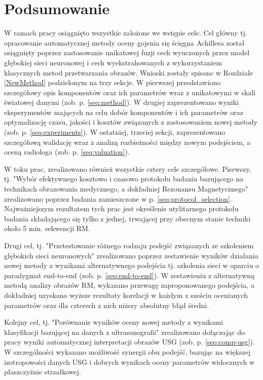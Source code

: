 \chapter{Podsumowanie}

W ramach pracy osiągnięto wszystkie założone we wstępie cele. Cel główny tj. opracowanie automatycznej metody oceny gojenia się ścięgna Achillesa został osiągnięty poprzez zastosowanie unikatowej fuzji cech wyuczonych przez model głębokiej sieci neuronowej i cech wyekstrahowanych z wykorzystaniem klasycznych metod przetwarzania obrazów. Wnioski zostały spisane w Rozdziale \ref{NewMethod} podzielonym na trzy sekcje. W pierwszej przedstawiono szczegółowy opis komponentów oraz ich parametrów wraz z unikatowymi w skali światowej danymi (zob. p. \ref{seq:method}). W drugiej zaprezentowano wyniki eksperymentów mających na celu dobór komponentów i ich parametrów oraz optymalizację czasu, jakości i kosztów związanych z zastosowaniem nowej metody (zob. p. \ref{seq:experiments}). W ostatniej, trzeciej sekcji, zaprezentowano szczegółową walidację wraz z analizą rozbieżności między nowym podejściem, a oceną radiologa (zob. p. \ref{seq:valuation}).

W toku prac, zrealizowano również wszystkie cztery cele szczegółowe. Pierwszy, tj. "Wybór efektywnego kosztowo i czasowo protokołu badania bazującego \linebreak na technikach obrazowania medycznego, a dokładniej Rezonansu Magnetycznego" zrealizowano poprzez badania zamieszczone w p. \ref{seq:protocol_selection}. Najważniejszym rezultatem tych prac jest określenie utylitarnego protokołu badania składającego się tylko \linebreak z jednej, trwającej przy obecnym stanie techniki około 5 min. sekwencji RM. 

Drugi cel, tj. "Przetestowanie różnego rodzaju podejść związanych ze szkoleniem głębokich sieci neuronowych" zrealizowano poprzez zestawienie wyników działania nowej metody z wynikami alternatywnego podejścia tj. szkolenia sieci w oparciu \linebreak o paradygmat end-to-end (zob. p. \ref{seq:end-to-end}). W zestawieniu z alternatywną metodą analizy obrazów RM, wykazano przewagę zaproponowanego podejścia, a dokładniej uzyskano wyższe rezultaty korelacji w każdym z sześciu ocenianych parametrów oraz dla czterech z nich niższy absolutny błąd średni.

Kolejny cel, tj. "Porównanie wyników oceny nowej metody z wynikami klasyfikacji bazującej na danych z ultrasonografii" zrealizowano dołączając do pracy wyniki automatycznej interpretacji obrazów USG (zob. p. \ref{seq:comp-usg}). W szczególności wykazano możliwość synergii obu podejść, bazując na większej izotropowości danych USG \linebreak i dobrych wynikach oceny parametrów widocznych w płaszczyźnie strzałkowej.

